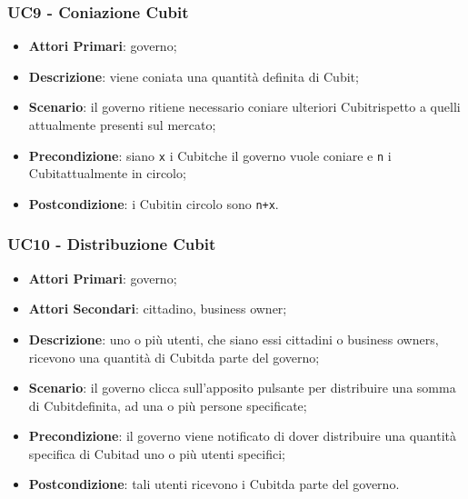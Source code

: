 \subsubsection{UC9 - Coniazione Cubit}
\begin{itemize}
	\item \textbf{Attori Primari}: governo;
	\item \textbf{Descrizione}: viene coniata una quantità definita di Cubit\glo;
	\item \textbf{Scenario}: il governo ritiene necessario coniare ulteriori Cubit\glosp rispetto a quelli attualmente presenti sul mercato;
	\item \textbf{Precondizione}: siano \texttt{x} i Cubit\glosp che il governo vuole coniare e \texttt{n} i Cubit\glosp attualmente in circolo;
	\item \textbf{Postcondizione}: i Cubit\glosp in circolo sono \texttt{n+x}.
\end{itemize}
\subsubsection{UC10 - Distribuzione Cubit}
\begin{itemize}
	\item \textbf{Attori Primari}: governo;
	\item \textbf{Attori Secondari}: cittadino, business owner;
	\item \textbf{Descrizione}: uno o più  utenti, che siano essi cittadini o business owners, ricevono una quantità di Cubit\glosp da parte del governo;
	\item \textbf{Scenario}: il governo clicca sull'apposito pulsante per distribuire una somma di Cubit\glosp definita, ad una o più persone specificate; 
	\item \textbf{Precondizione}: il governo viene notificato di dover distribuire una quantità specifica di Cubit\glosp ad uno o più utenti specifici;
	\item \textbf{Postcondizione}: tali utenti ricevono i Cubit\glosp da parte del governo.
\end{itemize}
